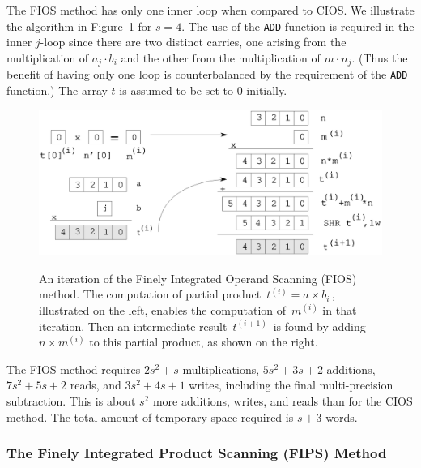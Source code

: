 \documentclass[twocolumn]{svjour3}          %
\begin{document}
The FIOS method has only one inner loop when compared to CIOS.  We
illustrate the algorithm in Figure~\ref{fios} for $s=4$.  The
use of the {\tt ADD} function is required in the inner $j$-loop since
there are two distinct carries, one arising from the multiplication of
$a_j\cdot b_i$ and the other from the multiplication of $m\cdot n_j$.
(Thus the benefit of having only one loop is counterbalanced by the
requirement of the {\tt ADD} function.) The array $t$ is assumed to be
set to 0 initially.

\begin{figure}[ht]
\caption[An iteration of the Finely Integrated Operand Scanning (FIOS) method.]
{An iteration of the Finely Integrated Operand Scanning (FIOS) method.
The computation of partial product $\,t^{(i)}=a\times b_i\,$,
illustrated on the left, enables the computation of $\,m^{(i)}$ in
that iteration. Then an intermediate result $\,t^{(i+1)}\,$ is
found by adding $n\times m^{(i)}$ to this partial product,
as shown on the right.}
\includegraphics[width=\columnwidth]{fios.eps}
\label{fios}
\end{figure}

The FIOS
method requires $2s^2+s$ multiplications,
$5s^2+3s+2$ additions, $7s^2+5s+2$ reads,
and $3s^2+4s+1$ writes, including the final multi-precision subtraction.
This is about $s^2$ more additions, writes, and reads than for
the CIOS method.
The total amount of temporary space required is $s+3$ words.


\subsubsection{The Finely Integrated Product Scanning (FIPS) Method}
\label{sect-fips}
\end{document}
